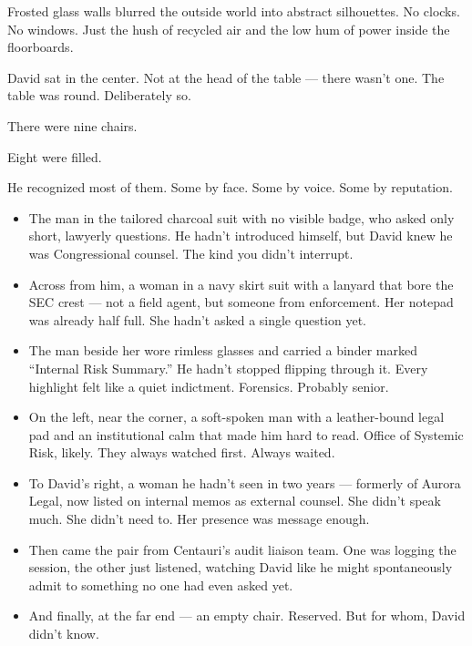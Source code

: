 Frosted glass walls blurred the outside world into abstract silhouettes. No clocks. No windows. Just the hush of recycled air and the low hum of power inside the floorboards.

David sat in the center. Not at the head of the table — there wasn’t one. The table was round. Deliberately so.

There were nine chairs.

Eight were filled.

He recognized most of them. Some by face. Some by voice. Some by reputation.

\begin{itemize}
\item The man in the tailored charcoal suit with no visible badge, who asked only short, lawyerly questions. He hadn’t introduced himself, but David knew he was Congressional counsel. The kind you didn’t interrupt.

\item Across from him, a woman in a navy skirt suit with a lanyard that bore the SEC crest — not a field agent, but someone from enforcement. Her notepad was already half full. She hadn't asked a single question yet.

\item The man beside her wore rimless glasses and carried a binder marked “Internal Risk Summary.” He hadn’t stopped flipping through it. Every highlight felt like a quiet indictment. Forensics. Probably senior.

\item On the left, near the corner, a soft-spoken man with a leather-bound legal pad and an institutional calm that made him hard to read. Office of Systemic Risk, likely. They always watched first. Always waited.

\item To David’s right, a woman he hadn’t seen in two years — formerly of Aurora Legal, now listed on internal memos as external counsel. She didn’t speak much. She didn’t need to. Her presence was message enough.

\item Then came the pair from Centauri’s audit liaison team. One was logging the session, the other just listened, watching David like he might spontaneously admit to something no one had even asked yet.

\item And finally, at the far end — an empty chair. Reserved. But for whom, David didn’t know.
\end{itemize}

